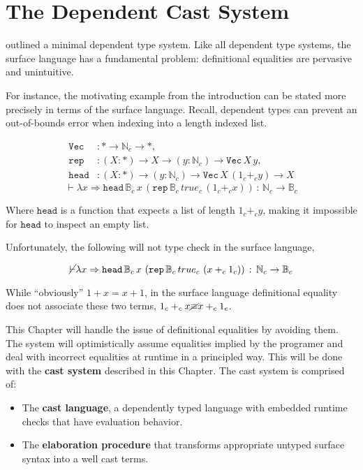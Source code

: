 \chapter{The Dependent Cast System}
\label{chapter:Cast}
\thispagestyle{myheadings}
 
 outlined a minimal dependent type system.
Like all dependent type systems, the surface language has a fundamental problem: definitional equalities are pervasive and unintuitive.
 
For instance, the motivating example from the introduction can be stated more precisely in terms of the surface language.
Recall, dependent types can prevent an out-of-bounds error when indexing into a length indexed list.

\begin{align*}
\mathtt{Vec} & :*\rightarrow\mathbb{N}_{c}\rightarrow*,\\
\mathtt{rep} & :\left(X:*\right)\rightarrow X\rightarrow\left(y:\mathbb{N}_{c}\right)\rightarrow\mathtt{Vec\,}X\,y,\\
\mathtt{head} & :\left(X:*\right)\rightarrow\left(y:\mathbb{N}_{c}\right)\rightarrow\mathtt{Vec}\,X\,\left(1_{c}+_{c}y\right)\rightarrow X
\end{align*}
\[
\vdash\lambda x\Rightarrow\mathtt{head}\,\mathbb{B}_{c}\,x\,\left(\mathtt{rep}\,\mathbb{B}_{c}\,true_{c}\,\left(1_{c}+_{c}x\right)\right)\,:\,\mathbb{N}_{c}\rightarrow\mathbb{B}_{c}
\]

Where $\mathtt{head}$ is a function that expects a list of length $1_{c}+_{c}y$, making it impossible for $\mathtt{head}$ to inspect an empty list.

Unfortunately, the following will not type check in the surface language,

\[
\cancel{\vdash}\lambda x\Rightarrow\mathtt{head}\,\mathbb{B}_{c}\,x\,\left(\mathtt{rep}\,\mathbb{B}_{c}\,true_{c}\,\left(x+_{c}1_{c}\right)\right)\,:\,\mathbb{N}_{c}\rightarrow\mathbb{B}_{c}
\]

\sloppy While ``obviously'' $1+x=x+1$, in the surface language definitional equality does not associate these two terms, $1_{c}+_{c}x\cancel{\equiv}x+_{c}1_{c}$.
 
This Chapter will handle the issue of definitional equalities by avoiding them.
The system will optimistically assume equalities implied by the programer and deal with incorrect equalities at runtime in a principled way.
This will be done with the \textbf{cast system} described in this Chapter.
The cast system is comprised of:
\begin{itemize}
\item The \textbf{cast language}, a dependently typed language with embedded runtime checks that have evaluation behavior.
\item The \textbf{elaboration procedure} that transforms appropriate untyped surface syntax into a well cast terms.
\end{itemize}
 
